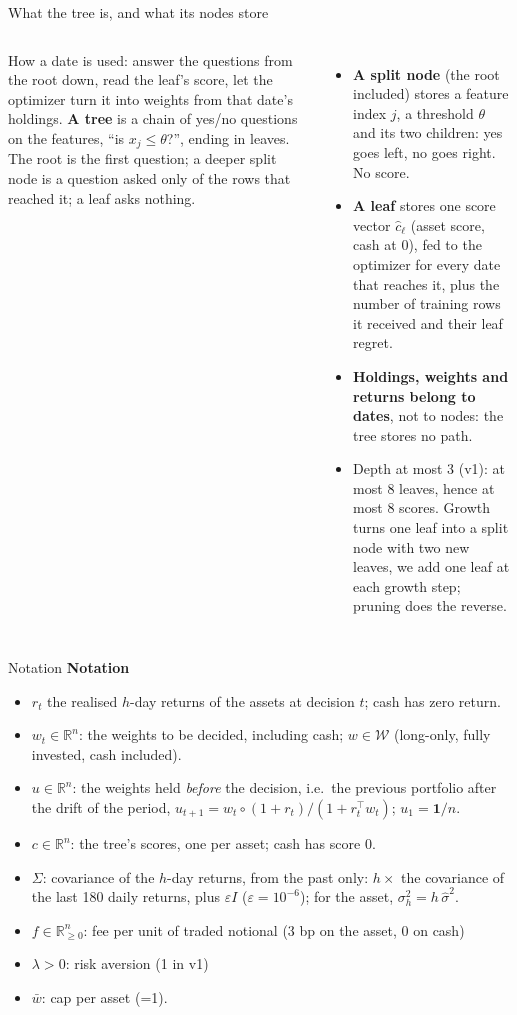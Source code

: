 \documentclass[10pt,aspectratio=169]{beamer}
\newcommand{\1}{\mathbf{1}}
\newcommand{\R}{\mathbb{R}}
\newcommand{\W}{\mathcal{W}}
\begin{document}
\begin{frame}{What the tree is, and what its nodes store}
\begin{columns}[T]
{\scriptsize How a date is used: answer the questions from the root down, read the leaf's score, let the optimizer turn it into weights from that date's holdings.}
\footnotesize
\textbf{A tree} is a chain of yes/no questions on the features, ``is $x_j\le\theta$?'', ending in leaves. The root is the first question; a deeper split node is a question asked only of the rows that reached it; a leaf asks nothing.
\begin{itemize}
\item \textbf{A split node} (the root included) stores a feature index $j$, a threshold $\theta$ and its two children: yes goes left, no goes right. No score.
\item \textbf{A leaf} stores one score vector $\hat c_\ell$ (asset score, cash at 0), fed to the optimizer for every date that reaches it, plus the number of training rows it received and their leaf regret.
\item \textbf{Holdings, weights and returns belong to dates}, not to nodes: the tree stores no path.
\item Depth at most 3 (v1): at most 8 leaves, hence at most 8 scores. Growth turns one leaf into a split node with two new leaves, we add one leaf at each growth step; pruning does the reverse.
\end{itemize}
\end{columns}
\end{frame}
\begin{frame}{Notation}
\textbf{Notation}
\begin{itemize}
\item $r_t$ the realised $h$-day returns of the assets at decision $t$; cash has zero return.
\item $w_t\in\R^n$: the weights to be decided, including cash; $w\in\W$ (long-only, fully invested, cash included).
\item $u\in\R^n$: the weights held \emph{before} the decision, i.e.\ the previous portfolio after the drift of the period, $u_{t+1}=w_t\circ(1+r_t)/(1+r_t^\top w_t)$; $u_1=\1/n$.
\item $c\in\R^n$: the tree's scores, one per asset; cash has score $0$.
\item $\Sigma$: covariance of the $h$-day returns, from the past only: $h\times$ the covariance of the last 180 daily returns, plus $\varepsilon I$ ($\varepsilon=10^{-6}$); for the asset, $\sigma_h^2=h\,\hat\sigma^2$.
\item $f\in\R^n_{\ge0}$: fee per unit of traded notional (3 bp on the asset, 0 on cash)
\item $\lambda>0$: risk aversion (1 in v1)
\item $\bar w$: cap per asset (=1).
\end{itemize}
\end{frame}
\end{document}
